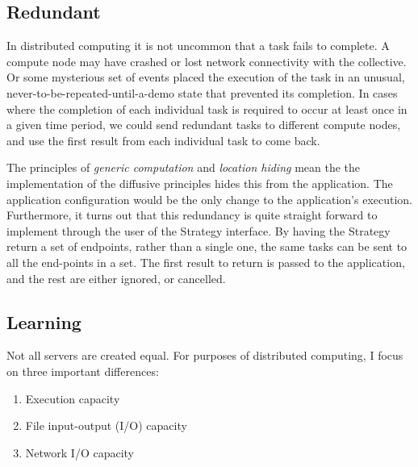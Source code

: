 \documentclass[11pt]{article}
\begin{document}


\subsection{Redundant}
In distributed computing it is not uncommon that a task fails to complete. A compute node may have crashed or lost network connectivity with the collective. Or some mysterious set of events placed the execution of the task in an unusual, never-to-be-repeated-until-a-demo state that prevented its completion. In cases where the completion of each individual task is required to occur at least once in a given time period, we could send redundant tasks to different compute nodes, and use the first result from each individual task to come back.

The principles of \emph{generic computation} and \emph{location hiding} mean the the implementation of the diffusive principles hides this from the application. The application configuration would be the only change to the application's execution. Furthermore, it turns out that this redundancy is quite straight forward to implement through the user of the \textsf{Strategy} interface. By having the \textsf{Strategy} return a set of endpoints, rather than a single one, the same tasks can be sent to all the end-points in a set. The first result to return is passed to the application, and the rest are either ignored, or cancelled.

\subsection{Learning}
Not all servers are created equal. For purposes of distributed computing, I focus on three important differences:
\begin{enumerate}
\item Execution capacity
\item File input-output (I/O) capacity
\item Network I/O capacity
\end{enumerate}
\end{document}
